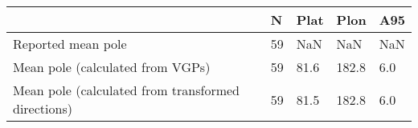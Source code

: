 \begin{tabular}{lllll}
\toprule
{} &   N &  Plat &   Plon &  A95 \\
\midrule
Reported mean pole                                 &  59 &   NaN &    NaN &  NaN \\
Mean pole (calculated from VGPs)                   &  59 &  81.6 &  182.8 &  6.0 \\
Mean pole (calculated from transformed directions) &  59 &  81.5 &  182.8 &  6.0 \\
\bottomrule
\end{tabular}
